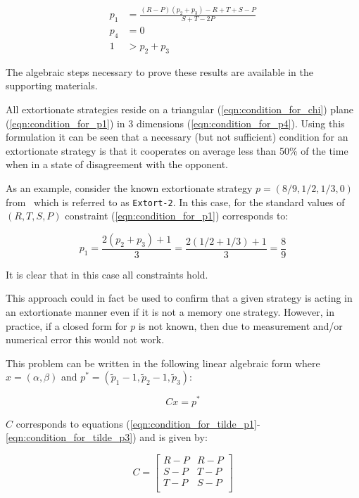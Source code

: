 \documentclass[a4paper]{article}
\begin{document}
\begin{align}
    p_1 & = \frac{(R-P)(p_2 + p_3) - R + T + S - P}{S + T - 2P}
     \label{eqn:condition_for_p1}\\
    p_4 & = 0 \label{eqn:condition_for_p4}\\
    1 & > p_2 + p_3\label{eqn:condition_for_chi}
\end{align}

The algebraic steps necessary to prove these results are available in the
supporting materials.

All extortionate strategies reside on a triangular (\ref{eqn:condition_for_chi})
plane (\ref{eqn:condition_for_p1}) in 3 dimensions (\ref{eqn:condition_for_p4}).
Using this formulation it can be seen that a necessary (but not sufficient)
condition for an extortionate strategy is that it cooperates on average less
than 50\% of the time when in a state of disagreement with the opponent.

As an example, consider the known extortionate strategy \(p=(8 / 9, 1 / 2, 1 /
3, 0)\) from~\cite{Stewart2012} which is referred to as \texttt{Extort-2}. In
this case, for the standard values of \((R, T, S, P)\) constraint
(\ref{eqn:condition_for_p1}) corresponds to:

\begin{equation}
    p_1 = \frac{2(p_2 + p_3) + 1}{3}
        = \frac{2(1 / 2 + 1 / 3) + 1}{3}
        = \frac{8}{9}
\end{equation}

It is clear that in this case all constraints hold.

This approach could in fact be used to confirm that a given strategy is acting
in an extortionate manner even if it is not a memory one strategy. However, in
practice, if a closed form for \(p\) is not known, then due to measurement
and/or numerical error this would not work.

This problem can be written in the following linear algebraic form where
\(x=(\alpha, \beta)\)
and \(p^*=(\tilde p_1 - 1, \tilde p_2 - 1, \tilde p_3)\):

\begin{equation}\label{eqn:linear_algebraic_equation_for_p}
    Cx= p^*
\end{equation}

\(C\) corresponds to equations
(\ref{eqn:condition_for_tilde_p1}-\ref{eqn:condition_for_tilde_p3}) and is
given by:

\begin{equation}\label{eqn:definition_of_C}
    C =
    \begin{bmatrix}
        R - P & R- P \\
        S - P & T- P \\
        T - P & S- P \\
    \end{bmatrix}
\end{equation}
\end{document}
